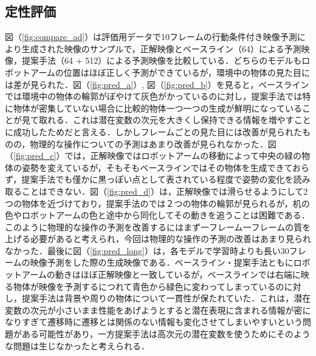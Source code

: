 \documentclass[10pt, twocolumn]{jarticle}
\begin{document}
\subsection{定性評価}
図（\ref{fig:compare_ad}）は評価用データで10フレームの行動条件付き映像予測により生成された映像のサンプルで，正解映像とベースライン（64）による予測映像，提案手法（64 + 512）による予測映像を比較している．どちらのモデルもロボットアームの位置はほぼ正しく予測ができているが，環境中の物体の見た目には差が見られた．図（\ref{fig:pred_a}）, 図（\ref{fig:pred_b}）を見ると，ベースラインでは環境中の物体の輪郭がぼやけて灰色がかっているのに対し，提案手法では特に物体が密集していない場合に比較的物体一つ一つの生成が鮮明になっていることが見て取れる．これは潜在変数の次元を大きくし保持できる情報を増やすことに成功したためだと言える．しかしフレームごとの見た目には改善が見られたものの，物理的な操作についての予測はあまり改善が見られなかった．図（\ref{fig:pred_c}）では，正解映像ではロボットアームの移動によって中央の緑の物体の姿勢を変えているが，そもそもベースラインではその物体を生成できておらず，提案手法でも僅かに黒っぽい点として表されている程度で姿勢の変化を読み取ることはできない．図（\ref{fig:pred_d}）は，正解映像では滑らせるようにして2つの物体を近づけており，提案手法のでは２つの物体の輪郭が見られるが，机の色やロボットアームの色と途中から同化してその動きを追うことは困難である．このように物理的な操作の予測を改善するにはまず一フレーム一フレームの質を上げる必要があると考えられ，今回は物理的な操作の予測の改善はあまり見られなかった．最後に図（\ref{fig:pred_long}）は，各モデルで学習時よりも長い30フレームの映像予測をした際の生成映像である．ベースライン・提案手法ともにロボットアームの動きはほぼ正解映像と一致しているが，ベースラインでは右端に映る物体が映像を予測するにつれて青色から緑色に変わってしまっているのに対し，提案手法は背景や周りの物体について一貫性が保たれていた．これは，潜在変数の次元が小さいまま性能をあげようとすると潜在表現に含まれる情報が密になりすぎて遷移時に遷移とは関係のない情報も変化させてしまいやすいという問題がある可能性があり，一方提案手法は高次元の潜在変数を使うためにそのような問題は生じなかったと考えられる．


\end{document}
